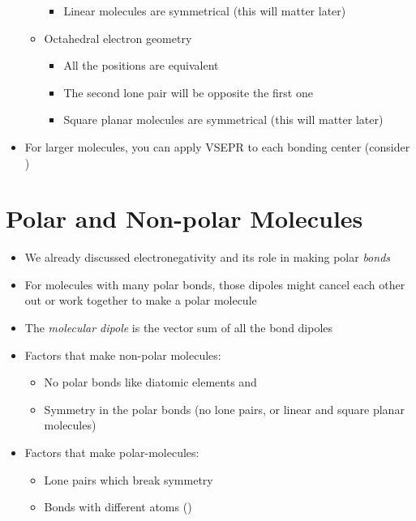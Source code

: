 \documentclass[12pt, openany, letterpaper]{memoir}
\begin{document}
\begin{itemize}
\begin{itemize}
\begin{itemize}
			\item Linear molecules are symmetrical (this will matter later)
		\end{itemize}
		\item Octahedral electron geometry
		\begin{itemize}
			\item All the positions are equivalent
			\item The second lone pair will be opposite the first one
			\item Square planar molecules are symmetrical (this will matter later)
		\end{itemize}
	\end{itemize}
	\item For larger molecules, you can apply VSEPR to each bonding center (consider )
\end{itemize}
\section{Polar and Non-polar Molecules}
\begin{itemize}
	\item We already discussed electronegativity and its role in making polar \emph{bonds}
	\item For molecules with many polar bonds, those dipoles might cancel each other out or work together to make a polar molecule
	\item The \emph{molecular dipole} is the vector sum of all the bond dipoles
	\item Factors that make non-polar molecules:
	\begin{itemize}
		\item No polar bonds like diatomic elements and 
		\item Symmetry in the polar bonds (no lone pairs, or linear and square planar molecules)
	\end{itemize}
	\item Factors that make polar-molecules:
	\begin{itemize}
		\item Lone pairs which break symmetry
		\item Bonds with different atoms ()
	\end{itemize}	
\end{itemize}
\end{document}
